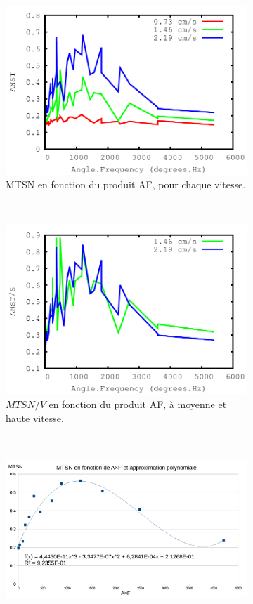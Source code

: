 	\begin{figure}[!htb]
		\begin{subfigure}[t]{0.49\textwidth}
			\centering
			\includegraphics[width=\textwidth]{figures/ch4/time_vs_AF_all_speeds}
			\caption{MTSN en fonction du produit AF, pour chaque vitesse.}
			\label{fig:tAFallSp}
		\end{subfigure}
		~
		\begin{subfigure}[t]{0.49\textwidth}
			\centering
			\includegraphics[width=\textwidth]{figures/ch4/time_vs_AF_all_speeds_normalized}
			\caption{$MTSN/V$ en fonction du produit AF, à moyenne et haute vitesse.}
			\label{fig:tAF_Spnorm}
		\end{subfigure}
		~
		\begin{subfigure}[t]{\textwidth}
			\centering
			\includegraphics[width=\textwidth]{figures/ch4/MTSNvAF}

\end{subfigure}
\end{figure}
